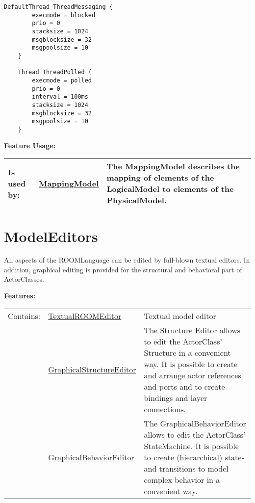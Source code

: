 	\begin{lstlisting}[language=etPhys]
	DefaultThread ThreadMessaging {
		execmode = blocked
		prio = 0
		stacksize = 1024
		msgblocksize = 32
		msgpoolsize = 10
	}
	
	Thread ThreadPolled {
		execmode = polled
		prio = 0
		interval = 100ms
		stacksize = 1024
		msgblocksize = 32
		msgpoolsize = 10
	}
	\end{lstlisting}
		
		
		
	\begingroup
	\textbf{Feature Usage:}
	\renewcommand{\arraystretch}{1.8} %
	\begin{longtable}{l|l p{}}
		\hline
	Is used by: & \tabitem \hyperlink{ref:MappingModel}{MappingModel}  & The MappingModel describes the mapping of elements of the LogicalModel to elements of the PhysicalModel.\\
	\hline
	\end{longtable}
	\endgroup
		
	
	\vspace{\baselineskip}
	\vspace{\baselineskip}
	\vspace{\baselineskip}
	
\section{ModelEditors}
	\hypertarget{ref:ModelEditors}{}
	All aspects of the ROOMLanguage can be edited by full-blown textual editors. In addition, graphical editing is provided for the structural and behavioral part of ActorClasses.
	
	
	\begingroup
	\textbf{Features:}
	\renewcommand{\arraystretch}{1.8} %
	\begin{longtable}{l|l p{}}
		\hline
	Contains: & \tabitem \hyperlink{ref:TextualROOMEditor}{TextualROOMEditor}  & Textual model editor\\
	& \tabitem \hyperlink{ref:GraphicalStructureEditor}{GraphicalStructureEditor}  & The Structure Editor allows to edit the ActorClass' Structure in a convenient way. It is possible to create and arrange actor references and ports and to create bindings and layer connections. \\
	& \tabitem \hyperlink{ref:GraphicalBehaviorEditor}{GraphicalBehaviorEditor}  & The GraphicalBehaviorEditor allows to edit the ActorClass' StateMachine. It is possible to create (hierarchical) states and transitions to model complex behavior in a convenient way. \\
	\hline
	\end{longtable}
	\endgroup
	
